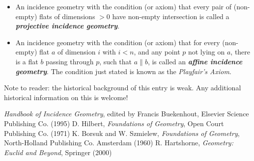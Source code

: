 \documentclass[12pt]{article}
\begin{document}
\begin{itemize}
We write $a\parallel b$.  Note that if $a\cap b=a$, then $a=b$, since $t(b)=t(a)$.  So if $a$ is parallel to $b$, $b$ is parallel to $a$, and we may say that $a$ and $b$ are parallel.  Parallelism is a reflexive and symmetric relation.  However, it is not  (as in the case of a hyperbolic geometry).  Condition 6 above can now be restated as: if two flats of dimensions $i$, both lying in a flat of dimension $i+1$, are not parallel, then their intersection is a flat of dimension $i-1$.
\item An incidence geometry with the condition (or axiom) that every pair
of (non-empty) flats of dimensions $>0$ have non-empty intersection is called a \textbf{\emph{projective incidence geometry}}.
\item An incidence geometry with the condition (or axiom) that for every (non-empty) flat $a$ of dimension $i$ with $i<n$, and any point $p$ not lying on $a$, there is a flat $b$ passing through $p$, such that $a\parallel b$, is called an \textbf{\emph{affine incidence geometry}}.  The condition just stated is known as the \emph{Playfair's Axiom}.
\end{itemize}

Note to reader: the historical background of this entry is weak.  Any additional historical information on this is welcome!

\begin{thebibliography}{6}
 {\it Handbook of Incidence Geometry}, edited by Francis Buekenhout,
Elsevier Science Publishing Co. (1995)
 D. Hilbert, {\it Foundations of Geometry}, Open Court Publishing Co. (1971)
 K. Borsuk and W. Szmielew, {\it Foundations of Geometry}, North-Holland Publishing Co. Amsterdam (1960)
 R. Hartshorne, {\it Geometry: Euclid and Beyond}, Springer (2000)
\end{thebibliography}
\end{document}
